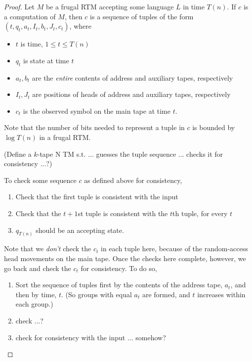 \documentclass[english]{article}
\theoremstyle{plain}
\theoremstyle{definition}
\theoremstyle{plain}
\begin{document}
\begin{proof}
Let $M$ be a frugal RTM accepting some language $L$ in time $T(n)$.
If $c$ is a computation of $M$, then $c$ is a sequence of tuples
of the form $(t,q_{t},a_{t},I_{t},b_{t},J_{t},c_{t})$, where

\begin{itemize}
 \item $t$ is time, $1\leq t\leq T(n)$
 \item $q_{t}$ is state at time $t$
 \item $a_{t},b_{t}$ are the \emph{entire} contents of address and auxiliary
   tapes, respectively
 \item $I_{t},J_{t}$ are positions of heads of address and auxiliary tapes,
   respectively
 \item $c_{t}$ is the observed symbol on the main tape at time $t$.
\end{itemize}
 
Note that the number of bits needed to represent a tuple in $c$ is
bounded by $\log T(n)$ in a frugal RTM.

(Define a $k$-tape N TM s.t. ... guesses the tuple sequence ... checks
it for consistency ...?)

To check some sequence $c$ as defined above for consistency,
 
\begin{enumerate}
 \item Check that the first tuple is consistent with the input
 \item Check that the $t+1$st tuple is consistent with the $t$th tuple,
   for every $t$
 \item $q_{T(n)}$ should be an accepting state.
\end{enumerate}

Note that we \emph{don't} check the $c_{t}$ in each tuple here, because
of the random-access head movements on the main tape. Once the checks
here complete, however, we go back and check the $c_{t}$ for consistency.
To do so,

\begin{enumerate}
 \item Sort the sequence of tuples first by the contents of the address tape,
   $a_{t}$, and then by time, $t$. (So groups with equal $a_{t}$ are
   formed, and $t$ increases within each group.)
 \item check ...?
 \item check for consistency with the input ... somehow?
\end{enumerate}

\end{proof}

\end{document}
